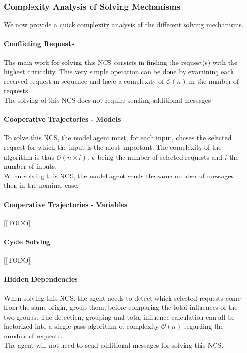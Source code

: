 \subsubsection*{Complexity Analysis of Solving Mechanisms}

We now provide a quick complexity analysis of the different solving mechanisms.

\paragraph*{Conflicting Requests}

The main work for solving this NCS consists in finding the request(s) with the highest criticality. This very simple operation can be done by examining each received request in sequence and have a complexity of $\mathcal{O}(n)$ in the number of requests.\\
The solving of this NCS does not require sending additional messages

\paragraph*{Cooperative Trajectories - Models}

To solve this NCS, the model agent must, for each input, choses the selected request for which the input is the most important. The complexity of the algorithm is thus $\mathcal{O}(n \times i)$, $n$ being the number of selected requests and $i$ the number of inputs.\\
When solving this NCS, the model agent sends the same number of messages then in the nominal case.

\paragraph*{Cooperative Trajectories - Variables}

[[TODO]]

\paragraph*{Cycle Solving}

[[TODO]]

\paragraph*{Hidden Dependencies}
When solving this NCS, the agent needs to detect which selected requests come from the same origin, group them, before comparing the total influences of the two groups. The detection, grouping and total influence calculation can all be factorized into a single pass algorithm of complexity $\mathcal{O}(n)$ regarding the number of requests.\\
The agent will not need to send additional messages for solving this NCS.

